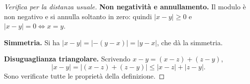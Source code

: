 \begin{proof}[Verifica per la distanza usuale]
\textbf{Non negatività e annullamento.} Il modulo è non negativo e si annulla soltanto in zero: quindi $|x-y|\ge0$ e $|x-y|=0\iff x=y$.

\textbf{Simmetria.} Si ha $|x-y|=|-(y-x)|=|y-x|$, che dà la simmetria.

\textbf{Disuguaglianza triangolare.} Scrivendo $x-y=(x-z)+(z-y)$,
\[
|x-y|=|(x-z)+(z-y)|\le|x-z|+|z-y|.
\]
Sono verificate tutte le proprietà della definizione.
\end{proof}
